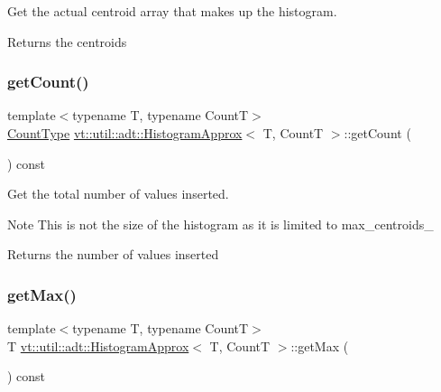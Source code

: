 Get the actual centroid array that makes up the histogram. 

\begin{DoxyReturn}{Returns}
the centroids 
\end{DoxyReturn}
\mbox{\label{structvt_1_1util_1_1adt_1_1_histogram_approx_af61bc8614a5096610387643fc05bf2e9}} 
\subsubsection{\texorpdfstring{get\+Count()}{getCount()}}
{\footnotesize\ttfamily template$<$typename T, typename CountT$>$ \\
\hyperlink{structvt_1_1util_1_1adt_1_1_histogram_approx_aa2fb74665588d311da76dd821f2912c6}{Count\+Type} \hyperlink{structvt_1_1util_1_1adt_1_1_histogram_approx}{vt\+::util\+::adt\+::\+Histogram\+Approx}$<$ T, CountT $>$\+::get\+Count (\begin{DoxyParamCaption}{ }\end{DoxyParamCaption}) const\hspace{0.3cm}{\ttfamily [inline]}}



Get the total number of values inserted. 

\begin{DoxyNote}{Note}
This is not the size of the histogram as it is limited to {\ttfamily max\+\_\+centroids\+\_\+} 
\end{DoxyNote}
\begin{DoxyReturn}{Returns}
the number of values inserted 
\end{DoxyReturn}
\mbox{\label{structvt_1_1util_1_1adt_1_1_histogram_approx_a3beb5b6e74470f8b6bf295217d5ff843}} 
\subsubsection{\texorpdfstring{get\+Max()}{getMax()}}
{\footnotesize\ttfamily template$<$typename T, typename CountT$>$ \\
T \hyperlink{structvt_1_1util_1_1adt_1_1_histogram_approx}{vt\+::util\+::adt\+::\+Histogram\+Approx}$<$ T, CountT $>$\+::get\+Max (\begin{DoxyParamCaption}{ }\end{DoxyParamCaption}) const\hspace{0.3cm}{\ttfamily [inline]}}




